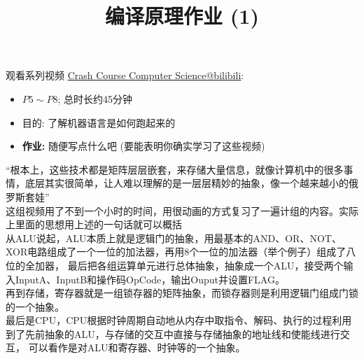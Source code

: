 \documentclass[a4paper, justified]{tufte-handout}
\title{编译原理作业 (1)}
\date{\zhtoday}
\begin{document}
\maketitle
\noplagiarism %
\begin{abstract}
\end{abstract}
\beginrequired
\begin{problem}
  观看系列视频 \href{https://www.bilibili.com/video/BV1EW411u7th?}{Crash Course Computer Science@bilibili}:
  \begin{itemize}
    \item $P5 \sim P8$; 总时长约45分钟
    \item 目的: 了解机器语言是如何跑起来的
    \item {\bf 作业:} 随便写点什么吧 (要能表明你确实学习了这些视频)
  \end{itemize}
\end{problem}

\begin{solution}
  “根本上，这些技术都是矩阵层层嵌套，来存储大量信息，就像计算机中的很多事情，底层其实很简单，让人难以理解的是一层层精妙的抽象，像一个越来越小的俄罗斯套娃”\\

  这组视频用了不到一个小时的时间，用很动画的方式复习了一遍计组的内容。实际上里面的思想用上述的一句话就可以概括\\
  
  从ALU说起，ALU本质上就是逻辑门的抽象，用最基本的AND、OR、NOT、XOR电路组成了一个一位的加法器，再用8个一位的加法器（举个例子）组成了八位的全加器，
  最后把各组运算单元进行总体抽象，抽象成一个ALU，接受两个输入InputA、InputB和操作码OpCode，输出Ouput并设置FLAG。\\

  再到存储，寄存器就是一组锁存器的矩阵抽象，而锁存器则是利用逻辑门组成门锁的一个抽象。\\

  最后是CPU，CPU根据时钟周期自动地从内存中取指令、解码、执行的过程利用到了先前抽象的ALU，与存储的交互中直接与存储抽象的地址线和使能线进行交互，
  可以看作是对ALU和寄存器、时钟等的一个抽象。

\end{solution}
\end{document}
